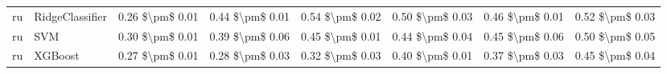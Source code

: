 \begin{tabular}{llllllll}
      ru &                 RidgeClassifier & 0.26 \$\textbackslash pm\$ 0.01 &           0.44 \$\textbackslash pm\$ 0.01 &       0.54 \$\textbackslash pm\$ 0.02 &        0.50 \$\textbackslash pm\$ 0.03 &                         0.46 \$\textbackslash pm\$ 0.01 &     0.52 \$\textbackslash pm\$ 0.03 \\
      ru &                             SVM & 0.30 \$\textbackslash pm\$ 0.01 &           0.39 \$\textbackslash pm\$ 0.06 &       0.45 \$\textbackslash pm\$ 0.01 &        0.44 \$\textbackslash pm\$ 0.04 &                         0.45 \$\textbackslash pm\$ 0.06 &     0.50 \$\textbackslash pm\$ 0.05 \\
      ru &                         XGBoost & 0.27 \$\textbackslash pm\$ 0.01 &           0.28 \$\textbackslash pm\$ 0.03 &       0.32 \$\textbackslash pm\$ 0.03 &        0.40 \$\textbackslash pm\$ 0.01 &                         0.37 \$\textbackslash pm\$ 0.03 &     0.45 \$\textbackslash pm\$ 0.04 \\
\bottomrule
\end{tabular}
